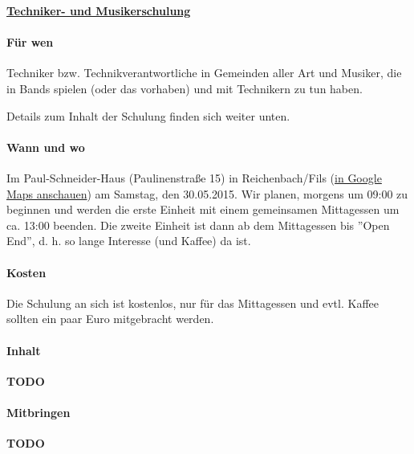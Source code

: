 \documentclass[11pt,a4paper]{article}
\begin{document}
\begin{center}
\underline{\textbf{\Large Techniker- und Musikerschulung}}
\end{center}
\paragraph{Für wen} Techniker bzw. Technikverantwortliche in Gemeinden aller Art und Musiker, die in Bands spielen (oder das vorhaben) und mit Technikern zu tun haben.

\noindent
Details zum Inhalt der Schulung finden sich weiter unten.


\paragraph{Wann und wo} Im Paul-Schneider-Haus (Paulinenstraße 15) in Reichenbach/Fils (\href{https://www.google.de/maps/place/Paul-Schneider-Haus/}{in Google Maps anschauen}) am Samstag, den 30.05.2015. Wir planen, morgens um 09:00 zu beginnen und werden die erste Einheit mit einem gemeinsamen Mittagessen um ca. 13:00 beenden. Die zweite Einheit ist dann ab dem Mittagessen bis ''Open End'', d. h. so lange Interesse (und Kaffee) da ist.

\paragraph{Kosten} Die Schulung an sich ist kostenlos, nur für das Mittagessen und evtl. Kaffee sollten ein paar Euro mitgebracht werden.

\paragraph{Inhalt} \textbf{TODO}

\paragraph{Mitbringen} \textbf{TODO}
\end{document}
